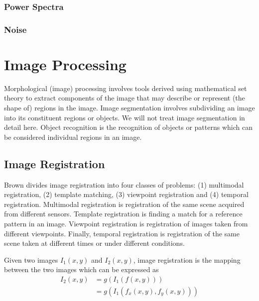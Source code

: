 \documentclass[11pt]{book}
\theoremstyle{example}
\begin{document}
\subsection{Power Spectra}

\subsection{Noise}

\chapter{Image Processing}

Morphological (image) processing involves tools derived using mathematical set theory to extract components of the image that may describe or represent (the shape of) regions in the image. Image segmentation involves subdividing an image into its constituent regions or objects. We will not treat image segmentation in detail here. Object recognition is the recognition of objects or patterns which can be considered individual regions in an image.

\section{Image Registration}

Brown divides image registration into four classes of problems: (1) multimodal registration, (2) template matching, (3) viewpoint registration and (4) temporal registration. Multimodal registration is registration of the same scene acquired from different sensors. Template registration is finding a match for a reference pattern in an image. Viewpoint registration is registration of images taken from different viewpoints. Finally, temporal registration is registration of the same scene taken at different times or under different conditions.

Given two images $I_1(x,y)$ and $I_2(x,y)$, image registration is the mapping between the two images which can be expressed as
\begin{align}
	I_2(x,y)&=g(I_1(f(x,y)))\\
	&=g(I_1(f_x(x,y),f_y(x,y)))
\end{align}
\end{document}

